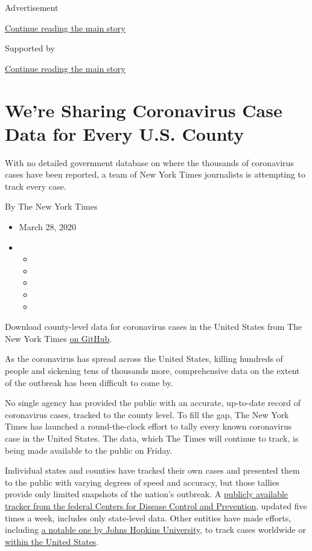 Advertisement

\protect\hyperlink{after-top}{Continue reading the main story}

Supported by

\protect\hyperlink{after-sponsor}{Continue reading the main story}

\hypertarget{were-sharing-coronavirus-case-data-for-every-us-county}{%
\section{We're Sharing Coronavirus Case Data for Every U.S.
County}\label{were-sharing-coronavirus-case-data-for-every-us-county}}

With no detailed government database on where the thousands of
coronavirus cases have been reported, a team of New York Times
journalists is attempting to track every case.

By The New York Times

\begin{itemize}
\item
  March 28, 2020
\item
  \begin{itemize}
  \item
  \item
  \item
  \item
  \item
  \end{itemize}
\end{itemize}

Download county-level data for coronavirus cases in the United States
from The New York Times
\href{https://github.com/nytimes/covid-19-data}{on GitHub}.

As the coronavirus has spread across the United States, killing hundreds
of people and sickening tens of thousands more, comprehensive data on
the extent of the outbreak has been difficult to come by.

No single agency has provided the public with an accurate, up-to-date
record of coronavirus cases, tracked to the county level. To fill the
gap, The New York Times has launched a round-the-clock effort to tally
every known coronavirus case in the United States. The data, which The
Times will continue to track, is being made available to the public on
Friday.

Individual states and counties have tracked their own cases and
presented them to the public with varying degrees of speed and accuracy,
but those tallies provide only limited snapshots of the nation's
outbreak. A
\href{https://www.cdc.gov/coronavirus/2019-ncov/cases-updates/cases-in-us.html}{publicly
available tracker from the federal Centers for Disease Control and
Prevention}, updated five times a week, includes only state-level data.
Other entities have made efforts, including
\href{https://www.arcgis.com/apps/opsdashboard/index.html\#/bda7594740fd40299423467b48e9ecf6}{a
notable one by Johns Hopkins University}, to track cases worldwide or
\href{https://coronavirus.1point3acres.com/en}{within the United
States}.

